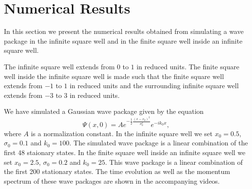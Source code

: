 \documentclass[12pt,a4paper]{article}
\begin{document}
\section{Numerical Results}
In this section we present the numerical results obtained from simulating a wave package in the infinite square well and in the finite square well inside an infinite square well.

The infinite square well extends from $0$ to $1$ in reduced units. The finite square well inside the infinite square well is made such that the finite square well extends from $-1$ to $1$ in reduced units and the surrounding infinite square well extends from $-3$ to $3$ in reduced units.

We have simulated a Gaussian wave package given by the equation
\begin{equation}
\Psi(x, 0) = A e^{- \frac{1}{2} \frac{(x - x_0)^2}{\sigma_0^2}} e^{- i k_0 x},
\end{equation}
where $A$ is a normalization constant. In the infinite square well we set $x_0 = 0.5$, $\sigma_0 = 0.1$ and $k_0 = 100$. The simulated wave package is a linear combination of the first 48 staionary states. In the finite square well inside an infinite square well we set $x_0 = 2.5$, $\sigma_0 = 0.2$ and $k_0 = 25$. This wave package is a linear combination of the first 200 stationary states. The time evolution as well as the momentum spectrum of these wave packages are shown in the accompanying videos.
\end{document}
